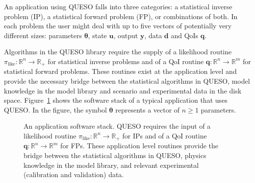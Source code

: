 

An application using QUESO falls into three categories: a statistical inverse problem (IP), a statistical forward problem (FP), or combinations of both.
In each problem the user might deal with up to five vectors of potentially very different sizes:
parameters $\boldsymbol{\theta}$, state $\mathbf{u}$, output $\mathbf{y}$, data $\mathbf{d}$ and QoIs $\mathbf{q}$.

Algorithms in the QUESO library require the supply
of a likelihood routine $\pi_{\text{like}}:\mathbb{R}^n\rightarrow\mathbb{R}_+$ for statistical inverse problems and 
of a QoI routine $\mathbf{q}:\mathbb{R}^n\rightarrow\mathbb{R}^m$ for statistical forward problems. These routines
exist at the application level and provide the necessary bridge between the statistical algorithms in QUESO,
model knowledge in the model library and scenario and experimental data in the disk space.
%
Figure~\ref{fig-sw-stack} shows the software stack of a typical application that uses QUESO. In the figure, the symbol $\boldsymbol{\theta}$ represents a vector of $n\geqslant 1$ parameters. 
%
\begin{figure}[!htbp]
\centerline{
}
\caption{
An application software stack.
QUESO requires the input
of a likelihood routine $\pi_{\text{like}}:\mathbb{R}^n\rightarrow\mathbb{R}_+$ for IPs and 
of a QoI routine $\mathbf{q}:\mathbb{R}^n\rightarrow\mathbb{R}^m$ for FPs.
These application level routines provide the bridge between
the statistical algorithms in QUESO,
physics 
knowledge in the model library, and relevant 
experimental (calibration
    and validation) data.
}
\label{fig-sw-stack}
\end{figure}

